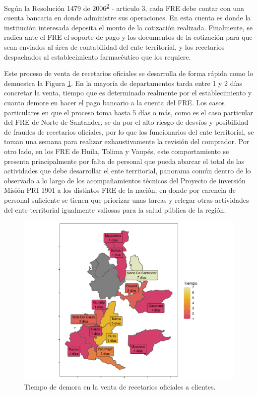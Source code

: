 \documentclass[
]{book}
\begin{document}
Según la Resolución 1479 de 2006\textsuperscript{\protect\hyperlink{ref-MSPS1479-2006}{2}} - articulo 3, cada FRE debe contar con una cuenta bancaria en donde administre sus operaciones. En esta cuenta es donde la institución interesada deposita el monto de la cotización realizada. Finalmente, se radica ante el FRE el soporte de pago y los documentos de la cotización para que sean enviados al área de contabilidad del ente territorial, y los recetarios despachados al establecimiento farmacéutico que los requiere.

Este proceso de venta de recetarios oficiales se desarrolla de forma rápida como lo demuestra la Figura \ref{fig:TiempoVentaInstituciones}. En la mayoría de departamentos tarda entre 1 y 2 días concretar la venta, tiempo que es determinado realmente por el establecimiento y cuanto demore en hacer el pago bancario a la cuenta del FRE. Los casos particulares en que el proceso toma hasta 5 días o más, como es el caso particular del FRE de Norte de Santander, se da por el alto riesgo de desvíos y posibilidad de fraudes de recetarios oficiales, por lo que los funcionarios del ente territorial, se toman una semana para realizar exhaustivamente la revisión del comprador. Por otro lado, en los FRE de Huila, Tolima y Vaupés, este comportamiento se presenta principalmente por falta de personal que pueda abarcar el total de las actividades que debe desarrollar el ente territorial, panorama común dentro de lo observado a lo largo de los acompañamientos técnicos del Proyecto de inversión Misión PRI 1901 a los distintos FRE de la nación, en donde por carencia de personal suficiente se tienen que priorizar unas tareas y relegar otras actividades del ente territorial igualmente valiosas para la salud pública de la región.

\begin{figure}

{\centering \includegraphics[width=0.9\linewidth]{InformeFinal_files/figure-latex/TiempoVentaInstituciones-1} 

}

\caption{Tiempo de demora en la venta de recetarios oficiales a clientes.}\label{fig:TiempoVentaInstituciones}
\end{figure}
\end{document}
